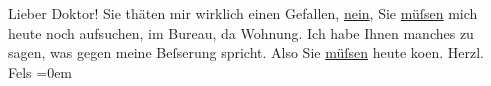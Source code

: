 \begin{ledgroupsized}[t]{13cm}
           \pstart
           Lieber Doktor! Sie thäten mir wirklich einen Gefallen, \uline{nein}, Sie \uline{müſsen} mich heute noch aufsuchen,
               im Bureau, da{\geminationn} Wohnung. Ich habe Ihnen manches zu sagen,
               was gegen meine Beſserung spricht. Also Sie \uline{müſsen}
               heute ko{\geminationm}en.\pend
           \pstart
           Herzl.{\\[\baselineskip]}\spacefill\mbox{Fels}\pend
           \leftskip=0em{}\endnumbering{}\end{ledgroupsized}  \newcommand{\dateiname}{L00153}\newcommand{\titel}{Friedrich M. Fels an Arthur Schnitzler, [1. 1. 1893?]}\newcommand{\editorInnen}{Martin Anton Müller und Gerd-Hermann Susen}
            \footnotesize
\begin{ledgroupsized}[t]{11.5cm}
\end{ledgroupsized}
         
      